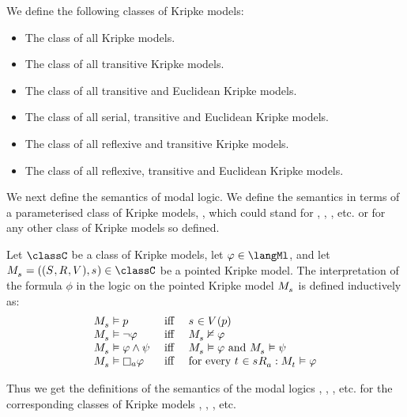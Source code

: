 \begin{definition}
We define the following classes of Kripke models:
\begin{itemize}
    \item The class \classK{} of all Kripke models.
    \item The class \classKF{} of all transitive Kripke models.
    \item The class \classKFF{} of all transitive and Euclidean Kripke models.
    \item The class \classKD{} of all serial, transitive and Euclidean Kripke models.
    \item The class \classSF{} of all reflexive and transitive Kripke models.
    \item The class \classS{} of all reflexive, transitive and Euclidean Kripke models.
\end{itemize}
\end{definition}

We next define the semantics of modal logic.
We define the semantics in terms of a parameterised class of Kripke models, \classC{}, which could stand for \classK{}, \classKF{}, \classKFF{}, etc. or for any other class of Kripke models so defined.

\begin{definition}\label{modal-semantics}
Let $\classC$ be a class of Kripke models, let $\phi \in \langMl$, and let $\pointedModelAndTuple{\stateS} \in \classC$ be a pointed Kripke model.
The interpretation of the formula $\phi$ in the logic \logicC{} on the pointed Kripke model $\pointedModel{\stateS}$ is defined inductively as:
$$
\begin{array}{lcl}
\pointedModel{\stateS} \entails \atomP & \text{ iff } & \stateS \in \valuation(\atomP)\\
\pointedModel{\stateS} \entails \lnot \phi & \text{ iff } & \pointedModel{\stateS} \nentails \phi\\
\pointedModel{\stateS} \entails \phi \land \psi & \text{ iff } & \pointedModel{\stateS} \entails \phi \text{ and } \pointedModel{\stateS} \entails \psi\\
\pointedModel{\stateS} \entails \necessary[\agentA] \phi & \text{ iff } & \text{for every } \stateT \in \successors{\agentA}{\stateS} : \pointedModel{\stateT} \entails \phi
\end{array}
$$
\end{definition}

Thus we get the definitions of the semantics of the modal logics \logicK{}, \logicKF{}, \logicKFF{}, etc. for the corresponding classes of Kripke models \classK{}, \classKF{}, \classKFF{}, etc.

